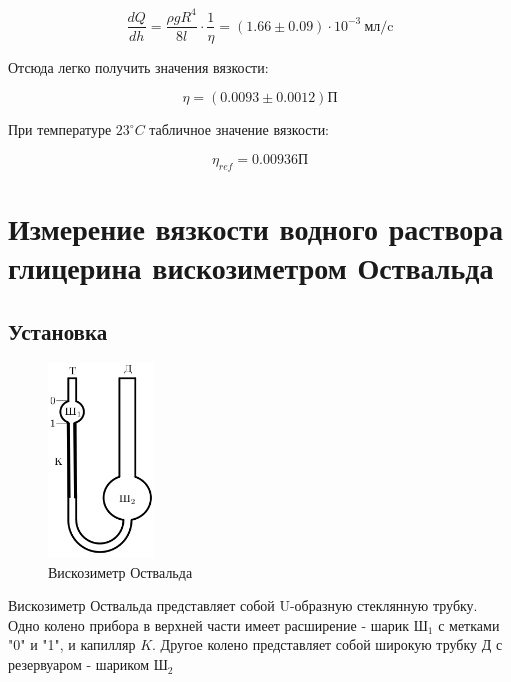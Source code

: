 \documentclass[a4paper]{article}
\begin{document}
\begin{equation}
    \frac{dQ}{dh} = \frac{\rho g R^4}{8l} \cdot \frac{1}{\eta} = (1.66 \pm 0.09) \cdot 10^{-3}
                                                           \  \text{мл}/\text{c}
\end{equation}

Отсюда легко получить значения вязкости:

\begin{equation}
    \eta = (0.0093 \pm 0.0012) \text{П}
\end{equation}

При температуре $23^\circ C$ табличное значение вязкости:

\begin{equation}
    \eta_{ref} = 0.00936 \text{П}
\end{equation}

\newpage

\section{Измерение вязкости водного раствора глицерина \newline вискозиметром Оствальда}

\subsection{Установка}
            
\begin{figure}
    \centering
    \includegraphics[width = 0.25\textwidth]{viski.png}
    \caption{Вискозиметр Оствальда}
\end{figure}

Вискозиметр Оствальда представляет собой U-образную стеклянную трубку.
Одно колено прибора в верхней части имеет расширение - шарик $\text{Ш}_1$ с метками
"0" и "1", и капилляр $K$. Другое колено представляет собой широкую трубку Д 
с резервуаром - шариком $\text{Ш}_2$
\end{document}
